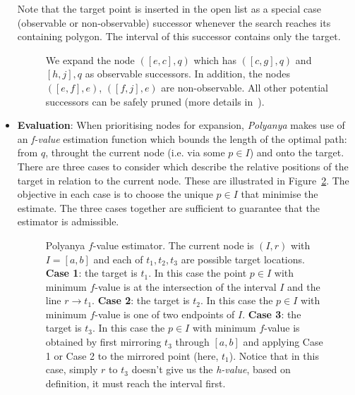\begin{itemize}
  Note that the target point is inserted in the open list as a special case
  (observable or non-observable) successor whenever the search reaches its 
  containing polygon.  The interval of this successor contains only the target.
  \begin{figure}[ht]
    \centering
    \caption{\small We expand the node $([e,c],q)$ which has
    $([c,g],q)$ and $[h, j], q$ as observable successors.
    In addition, the nodes $([e,f],e)$, $([f,j],e)$ are non-observable.
    All other potential successors can be safely pruned (more details in~\cite{cuicompromise}).}
    \label{suc}
  \end{figure}

\pagebreak
\item \textbf{Evaluation}: When prioritising nodes for expansion, \textit{Polyanya} makes use of an
  \textit{f-value} estimation function which bounds the length of the optimal path:
  from $q$, throught the current node (i.e. via some $p \in I$) and onto the target. There are
  three cases to consider which describe the relative positions of the target in relation to
  the current node. These are illustrated in Figure~\ref{ef}. The objective in each case is to
  choose the unique $p \in I$ that minimise the estimate. The three cases together are
  sufficient to guarantee that the estimator is admissible.

  \begin{figure}[htp]
    \centering
    
    \caption{\small
    Polyanya $f$-value estimator. The current node is $(I, r)$ with $I = [a, b]$ and
    each of $t_1, t_2, t_3$ are possible target locations.
    \textbf{Case 1}: the target is $t_1$. In this case the point $p \in I$ with minimum
    $f$-value is at the intersection of the interval $I$ and the line $r \rightarrow t_1$.
    \textbf{Case 2}: the target is $t_2$. In this case the $p \in I$ with minimum $f$-value
    is one of two endpoints of $I$. 
    \textbf{Case 3}: the target is $t_3$. In this case the $p \in I$ with minimum $f$-value
    is obtained by first mirroring $t_3$ through $[a, b]$ and applying Case 1 or Case 2
    to the mirrored point (here, $t_1$). Notice that in this case, simply $r$ to $t_3$
    doesn't give us the \textit{h-value}, based on definition, it must reach the interval
    first.
    }
  \label{ef}
  \end{figure}
\end{itemize}

